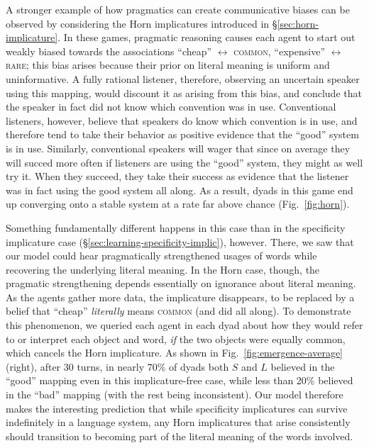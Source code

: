 \documentclass{article} %
\begin{document}
A stronger example of how pragmatics can create communicative biases can be
observed by considering the Horn implicatures introduced in \S\ref{sec:horn-implicature}. 
In these games, pragmatic reasoning causes each agent to start out
weakly biased towards the associations ``cheap'' $\leftrightarrow$
\textsc{common}, ``expensive'' $\leftrightarrow$ \textsc{rare}; this bias arises because their prior on literal meaning
is uniform and uninformative. A fully rational listener, therefore,
observing an uncertain speaker using this mapping, would discount it
as arising from this bias, and conclude that the speaker in fact did
not know which convention was in use. Conventional listeners,
however, believe that speakers do know which convention is in
use, and therefore tend to take their behavior as positive evidence that the
``good'' system is in use. Similarly, conventional speakers
will wager that since on average they will succed more often if
listeners are using the ``good'' system, they might as well try
it. When they succeed, they take their success as evidence that the listener was in
fact using the good system all along. As a result, dyads in this game
 end up converging onto a stable system at a rate far above
chance (Fig.~\ref{fig:horn}). 

Something
fundamentally different happens in this case than in the specificity
implicature case (\S\ref{sec:learning-specificity-implic}), however. There, we
saw that our model could hear pragmatically strengthened usages
of words while recovering the underlying literal meaning. In the Horn
case, though, the pragmatic strengthening depends essentially on
ignorance about literal meaning. As the agents gather more data,
the implicature disappears, to be replaced by a belief that
``cheap'' \textit{literally} means \textsc{common} (and did all along). To demonstrate
this phenomenon, we queried each agent in each dyad about how they would refer to
or interpret each object and word, \textit{if} the two objects were
equally common, which cancels the Horn implicature. As shown in
Fig.~\ref{fig:emergence-average} (right), after 30 turns, in nearly 70\%
of dyads both $S$ and $L$ believed in the ``good'' mapping even in
this implicature-free case, while less than 20\% believed in the
``bad'' mapping (with the rest being inconsistent). Our model therefore makes the
interesting prediction that while specificity implicatures can survive
indefinitely in a language system, any Horn implicatures that arise
consistently should transition to becoming part of the literal meaning
of the words involved.
\end{document}
